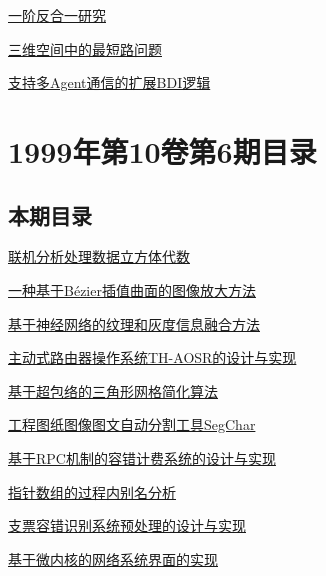 \documentclass[a4paper]{article}
\begin{document}
\href{http://www.jos.org.cn/ch/reader/download_pdf.aspx?file_no=19990717&year_id=1999&quarter_id=7&falg=1}{一阶反合一研究}

\href{http://www.jos.org.cn/ch/reader/download_pdf.aspx?file_no=19990718&year_id=1999&quarter_id=7&falg=1}{三维空间中的最短路问题}

\href{http://www.jos.org.cn/ch/reader/download_pdf.aspx?file_no=19990719&year_id=1999&quarter_id=7&falg=1}{支持多Agent通信的扩展BDI逻辑}


\section{\textbf{1999年第10卷第6期目录}}
\subsection{本期目录}
\href{http://www.jos.org.cn/ch/reader/download_pdf.aspx?file_no=19990601&year_id=1999&quarter_id=6&falg=1}{联机分析处理数据立方体代数}

\href{http://www.jos.org.cn/ch/reader/download_pdf.aspx?file_no=19990602&year_id=1999&quarter_id=6&falg=1}{一种基于Bézier插值曲面的图像放大方法}

\href{http://www.jos.org.cn/ch/reader/download_pdf.aspx?file_no=19990603&year_id=1999&quarter_id=6&falg=1}{基于神经网络的纹理和灰度信息融合方法}

\href{http://www.jos.org.cn/ch/reader/download_pdf.aspx?file_no=19990604&year_id=1999&quarter_id=6&falg=1}{主动式路由器操作系统TH-AOSR的设计与实现}

\href{http://www.jos.org.cn/ch/reader/download_pdf.aspx?file_no=19990605&year_id=1999&quarter_id=6&falg=1}{基于超包络的三角形网格简化算法}

\href{http://www.jos.org.cn/ch/reader/download_pdf.aspx?file_no=19990606&year_id=1999&quarter_id=6&falg=1}{工程图纸图像图文自动分割工具SegChar}

\href{http://www.jos.org.cn/ch/reader/download_pdf.aspx?file_no=19990607&year_id=1999&quarter_id=6&falg=1}{基于RPC机制的容错计费系统的设计与实现}

\href{http://www.jos.org.cn/ch/reader/download_pdf.aspx?file_no=19990608&year_id=1999&quarter_id=6&falg=1}{指针数组的过程内别名分析}

\href{http://www.jos.org.cn/ch/reader/download_pdf.aspx?file_no=19990609&year_id=1999&quarter_id=6&falg=1}{支票容错识别系统预处理的设计与实现}

\href{http://www.jos.org.cn/ch/reader/download_pdf.aspx?file_no=19990610&year_id=1999&quarter_id=6&falg=1}{基于微内核的网络系统界面的实现}
\end{document}
